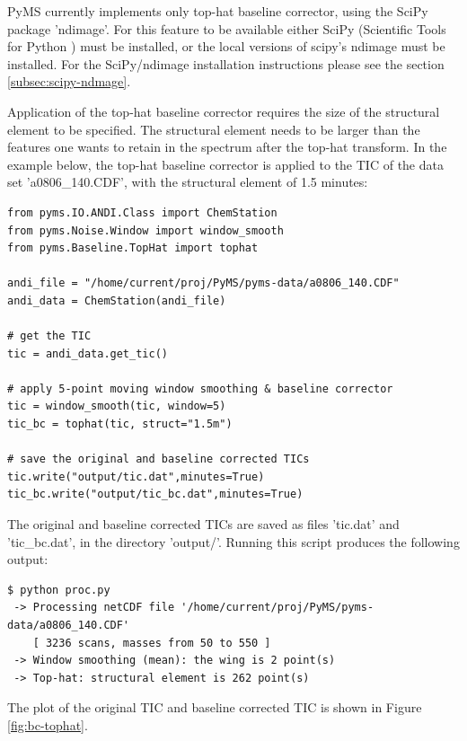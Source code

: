 PyMS currently implements only top-hat baseline corrector, using the SciPy
package 'ndimage'. For this feature to be available either SciPy (Scientific
Tools for Python \cite{scipy}) must be installed, or the local versions of
scipy's ndimage must be installed. For the SciPy/ndimage installation
instructions please see the section \ref{subsec:scipy-ndmage}.

Application of the top-hat baseline corrector requires the size of the structural
element to be specified. The structural element needs to be larger than the
features one wants to retain in the spectrum after the top-hat transform.
In the example below, the top-hat baseline corrector is applied to the TIC
of the data set 'a0806\_140.CDF', with the structural element of 1.5 minutes:

\begin{verbatim}
from pyms.IO.ANDI.Class import ChemStation
from pyms.Noise.Window import window_smooth
from pyms.Baseline.TopHat import tophat

andi_file = "/home/current/proj/PyMS/pyms-data/a0806_140.CDF"
andi_data = ChemStation(andi_file)

# get the TIC
tic = andi_data.get_tic()

# apply 5-point moving window smoothing & baseline corrector
tic = window_smooth(tic, window=5)
tic_bc = tophat(tic, struct="1.5m")

# save the original and baseline corrected TICs
tic.write("output/tic.dat",minutes=True)
tic_bc.write("output/tic_bc.dat",minutes=True)
\end{verbatim}

\noindent
The original and baseline corrected TICs are saved as files 'tic.dat' and
'tic\_bc.dat', in the directory 'output/'. Running this script produces the
following output:

\begin{verbatim}
$ python proc.py
 -> Processing netCDF file '/home/current/proj/PyMS/pyms-data/a0806_140.CDF'
    [ 3236 scans, masses from 50 to 550 ]
 -> Window smoothing (mean): the wing is 2 point(s)
 -> Top-hat: structural element is 262 point(s)
\end{verbatim}

\noindent
The plot of the original TIC and baseline corrected TIC is shown in
Figure \ref{fig:bc-tophat}.

